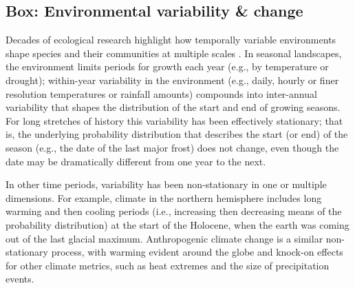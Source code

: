 \documentclass[11pt,letterpaper]{article}
\begin{document}
\subsection{Box: Environmental variability \& change} %
Decades of ecological research highlight how temporally variable environments shape species and their communities at multiple scales \citep{Sale:1977oq,Chesson:1997dz}.  In seasonal landscapes, the environment limits periods for growth each year (e.g., by temperature or drought); within-year variability in the environment (e.g., daily, hourly or finer resolution temperatures or rainfall amounts) compounds into inter-annual variability that shapes the distribution of the start and end of growing seasons. For long stretches of history this variability has been effectively stationary; that is, the underlying probability distribution that describes the start (or end) of the season (e.g., the date of the last major frost) does not change, even though the date may be dramatically different from one year to the  next. %

In other time periods, variability has been non-stationary in one or multiple dimensions. For example, climate in the northern hemisphere includes long warming and then cooling periods (i.e., increasing then decreasing means of the probability distribution) at the start of the Holocene, when the earth was coming out of the last glacial maximum. Anthropogenic climate change is a similar non-stationary process, with warming evident around the globe and knock-on effects for other climate metrics, such as heat extremes and the size of precipitation events. %
\end{document}

